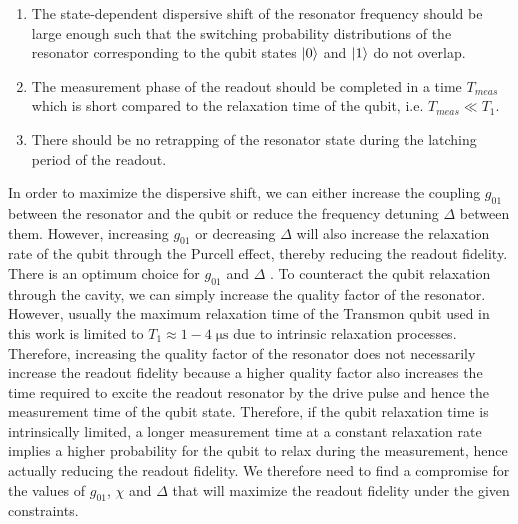 \begin{enumerate}
\item The state-dependent dispersive shift of the resonator frequency should be large enough such that the switching probability distributions of the resonator corresponding to the qubit states $\left| 0 \right>$ and $\left| 1 \right>$ do not overlap.
\item The measurement phase of the readout should be completed in a time $T_{meas}$ which is short compared to the relaxation time of the qubit, i.e. $T_{meas}\ll T_1$.
\item There should be no retrapping of the resonator state during the latching period of the readout.
\end{enumerate}

In order to maximize the dispersive shift, we can either increase the coupling $g_{01}$ between the resonator and the qubit or reduce the frequency detuning $\Delta$ between them. However, increasing $g_{01}$ or decreasing $\Delta$ will also increase the relaxation rate of the qubit through the Purcell effect, thereby reducing the readout fidelity. There is an optimum choice for $g_{01}$ and $\Delta$ \citep{mallet_single-shot_2009}. To counteract the qubit relaxation through the cavity, we can simply increase the quality factor of the resonator. However, usually the maximum relaxation time of the Transmon qubit used in this work is limited to $T_1\approx 1-4\;\mathrm{\mu s}$ due to intrinsic relaxation processes. Therefore, increasing the quality factor of the resonator does not necessarily increase the readout fidelity because a higher quality factor also increases the time required to excite the readout resonator by the drive pulse and hence the measurement time of the qubit state. Therefore, if the qubit relaxation time is intrinsically limited, a longer measurement time at a constant relaxation rate implies a higher probability for the qubit to relax during the measurement, hence actually reducing the readout fidelity. We therefore need to find a compromise for the values of $g_{01}$, $\chi$ and $\Delta$ that will maximize the readout fidelity under the given constraints.

